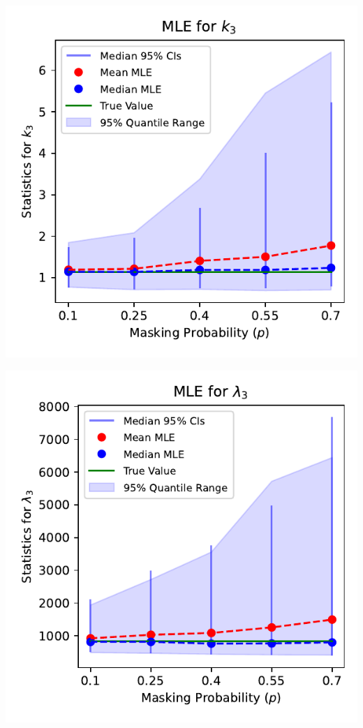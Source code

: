 \documentclass{article}
\begin{document}

\noindent
\begin{minipage}[t]{0.475\textwidth}
  \centering
  \includegraphics[width=\textwidth,height=0.33\textheight,keepaspectratio]{plot-p-vs-shape.3.pdf}
\end{minipage}%
\begin{minipage}[t]{0.475\textwidth}
  \centering
  \includegraphics[width=\textwidth,height=0.33\textheight,keepaspectratio]{plot-p-vs-scale.3.pdf}
\end{minipage}
\end{document}
